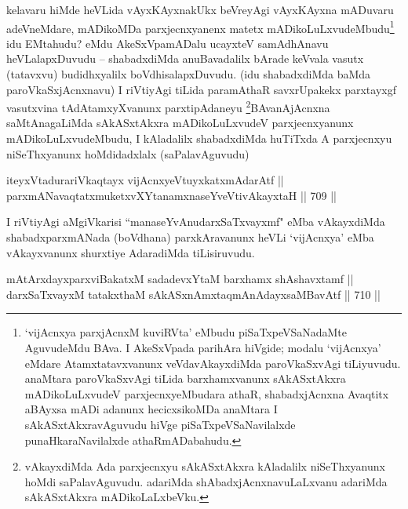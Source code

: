 \begin{artha} 
kelavaru hiMde heVLida vAyxKAyxnakUkx beVreyAgi vAyxKAyxna mADuvaru 
adeVneMdare, mADikoMDa parxjecnxyanenx matetx 
mADikoLuLxvudeMbudu\footnote{`vijAcnxya parxjAcnxM kuviRVta' eMbudu 
piSaTxpeVSaNadaMte AguvudeMdu BAva. I AkeSxVpada parihAra hiVgide; 
modalu `vijAcnxya' eMdare Atamxtatavxvanunx veVdavAkayxdiMda 
paroVkaSxvAgi tiLiyuvudu. anaMtara paroVkaSxvAgi tiLida barxhamxvanunx 
sAkASxtAkxra mADikoLuLxvudeV parxjecnxyeMbudara athaR, shabadxjAcnxna 
Avaqtitx aBAyxsa mADi adanunx hecicxsikoMDa anaMtara I 
sAkASxtAkxravAguvudu hiVge piSaTxpeVSaNavilalxde punaHkaraNavilalxde 
athaRmADabahudu.} idu EMtahudu? eMdu AkeSxVpamADalu 
ucayxteV samAdhAnavu heVLalapxDuvudu {\rm --} shabadxdiMda anuBavadalilx 
bArade keVvala vasutx (tatavxvu) budidhxyalilx boVdhisalapxDuvudu. 
(idu shabadxdiMda baMda paroVkaSxjAcnxnavu) I riVtiyAgi tiLida 
paramAthaR savxrUpakekx parxtayxgf vasutxvina tAdAtamxyXvanunx 
parxtipAdaneyu \footnote{vAkayxdiMda Ada parxjecnxyu sAkASxtAkxra 
kAladalilx niSeThxyanunx hoMdi saPalavAguvudu. adariMda 
shAbadxjAcnxnavuLaLxvanu adariMda sAkASxtAkxra mADikoLaLxbeVku.}BAvanAjAcnxna saMtAnagaLiMda sAkASxtAkxra 
mADikoLuLxvudeV parxjecnxyanunx mADikoLuLxvudeMbudu, I kAladalilx 
shabadxdiMda huTiTxda A parxjecnxyu niSeThxyanunx hoMdidadxlalx 
(saPalavAguvudu) 
\end{artha}

\begin{shl}
iteyxVtadurariVkaqtayx vijAcnxyeVtuyxkatxmAdarAtf || \\
parxmANavaqtatxmuketxvXYtanamxnaseYveVtivAkayxtaH \hfill || 709 ||  
\end{shl}

\begin{artha} 
I riVtiyAgi aMgiVkarisi ``manaseYvAnudarxSaTxvayxmf" eMba vAkayxdiMda 
shabadxparxmANada (boVdhana) parxkAravanunx heVLi `vijAcnxya' eMba 
vAkayxvanunx shurxtiye AdaradiMda tiLisiruvudu.
\end{artha}


\begin{shl}
mAtArxdayxparxviBakatxM sadadevxYtaM barxhamx shAshavxtamf || \\
darxSaTxvayxM tatakxthaM sAkASxnAmxtaqmAnAdayxsaMBavAtf \hfill || 710 ||  
\end{shl}

